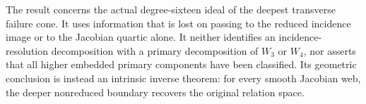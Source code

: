 The result concerns the actual degree-sixteen ideal of the deepest
transverse failure cone.  It uses information that is lost on passing
to the reduced incidence image or to the Jacobian quartic alone.
It neither identifies an incidence-resolution decomposition with a
primary decomposition of \(W_3\) or \(W_4\), nor asserts that
all higher embedded primary components have been classified.  Its
geometric conclusion is instead an intrinsic inverse theorem: for every
smooth Jacobian web, the deeper nonreduced boundary recovers the
original relation space.


